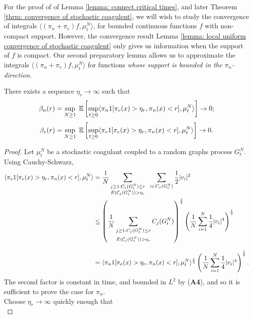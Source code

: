 For the proof of of Lemma \ref{lemma: connect critical times}, and later Theorem \ref{thrm: convergence of stochastic coagulent}, we will wish to study the convergence of integrals $\langle (\pi_n+\pi_e)f, \mu^N_t\rangle$, for bounded continuous functions $f$ with non-compact support. However, the convergence result Lemma \ref{lemma: local uniform convergence of stochastic coagulent} only gives us information when the support of $f$ is compact. Our second preparatory lemma allows us to approximate the integrals $\langle (\pi_n+\pi_e)f, \mu^N_t\rangle$ for functions \emph{whose support is bounded in the $\pi_n$-direction}. \begin{lemma}\label{lemma: etar} There exists a sequence $\eta_r \rightarrow \infty$ such that \begin{equation}
    \beta_n(r)=\sup_{N\geq 1} \hspace{0.1cm} \mathbb{E}\left[\sup_{t\geq 0}\langle \pi_n 1[\pi_e(x)>\eta_r, \pi_n(x)< r], \mu^N_t\rangle \right]\rightarrow 0;
\end{equation} \begin{equation}
    \beta_e(r)= \sup_{N\geq 1} \hspace{0.1cm} \mathbb{E}\left[\sup_{t\geq 0}\langle \pi_e 1[\pi_e(x)>\eta_r, \pi_n(x)< r], \mu^N_t\rangle\right] \rightarrow 0. 
\end{equation} \end{lemma} \begin{proof} Let $\mu^N_t$ be a stochastic coagulant coupled to a random graphs process $G^N_t$. Using Cauchy-Schwarz, \begin{equation} \begin{split}
   \langle \pi_e 1[\pi_e(x)>\eta_r, \pi_n(x)< r], \mu^N_t\rangle & = \frac{1}{N} \sum_{\substack{j\geq 1: C_j(G^N_t)\le r \\ E(\mathcal{C}_j(G^N_t))>\eta_r}} \hspace{0.2cm} \sum_{i\in C_j(G^N_t)} \frac{1}{2}|v_i|^2  \\ & \leq \left(\frac{1}{N} \sum_{\substack{j\geq 1: C_j(G^N_t)\le r \\[1ex] E(\mathcal{C}_j(G^N_t))>\eta_r}} C_j(G^N_t)\right)^\frac{1}{2}\left(\frac{1}{N}\sum_{i=1}^N \frac{1}{4}|v_i|^4\right)^\frac{1}{2}  \\[2ex] & = \langle \pi_n 1[\pi_e(x)>\eta_r, \pi_n(x)< r], \mu^N_t\rangle^\frac{1}{2}\left(\frac{1}{N}\sum_{i=1}^N \frac{1}{4}|v_i|^4\right)^\frac{1}{2}.
\end{split} \end{equation} The second factor is constant in time, and bounded in $L^2$ by (\textbf{A4}), and so it is sufficient to prove the case for $\pi_n$. \medskip \\ Choose $\eta_r\rightarrow \infty$ quickly enough that \begin{equation} \label{eq: choice of etar}

\end{equation}
\end{proof}
